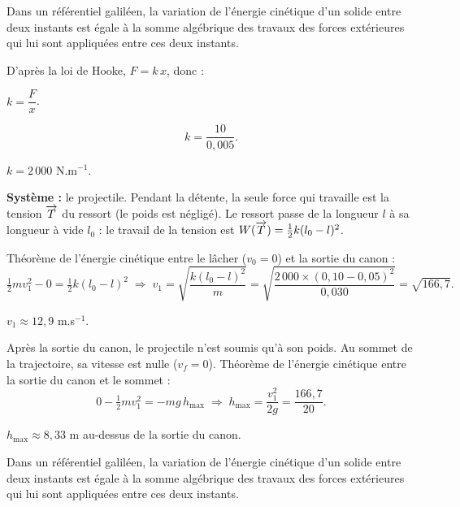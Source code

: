 
Dans un référentiel galiléen, la variation de l'énergie cinétique d'un solide entre deux instants est
égale à la somme algébrique des travaux des forces extérieures qui lui sont appliquées entre ces
deux instants.

D'après la loi de Hooke, $F = k\,x$, donc :
\begin{resultat}
$k = \dfrac{F}{x}$.
\end{resultat}

\[
k = \frac{10}{0,005}.
\]
\begin{resultat}
$k = 2\,000$ N.m$^{-1}$.
\end{resultat}

\textbf{Système :} le projectile. Pendant la détente, la seule force qui travaille est la tension
$\overrightarrow{T}$ du ressort (le poids est négligé). Le ressort passe de la longueur $l$ à sa longueur à vide
$l_0$ : le travail de la tension est $W(\overrightarrow{T}) = \tfrac{1}{2} k (l_0 - l)^2$.

Théorème de l'énergie cinétique entre le lâcher ($v_0 = 0$) et la sortie du canon :
\[
\tfrac{1}{2} m v_1^2 - 0 = \tfrac{1}{2} k (l_0 - l)^2
\;\Longrightarrow\;
v_1 = \sqrt{\frac{k (l_0 - l)^2}{m}} = \sqrt{\frac{2\,000 \times (0,10 - 0,05)^2}{0,030}}
= \sqrt{166,7}.
\]
\begin{resultat}
$v_1 \approx 12,9$ m.s$^{-1}$.
\end{resultat}

Après la sortie du canon, le projectile n'est soumis qu'à son poids. Au sommet de la trajectoire, sa
vitesse est nulle ($v_f = 0$). Théorème de l'énergie cinétique entre la sortie du canon et le
sommet :
\[
0 - \tfrac{1}{2} m v_1^2 = - m g\, h_{\max}
\;\Longrightarrow\;
h_{\max} = \frac{v_1^2}{2g} = \frac{166,7}{20}.
\]
\begin{resultat}
$h_{\max} \approx 8,33$ m au-dessus de la sortie du canon.
\end{resultat}


Dans un référentiel galiléen, la variation de l'énergie cinétique d'un solide entre deux instants est
égale à la somme algébrique des travaux des forces extérieures qui lui sont appliquées entre ces
deux instants.

